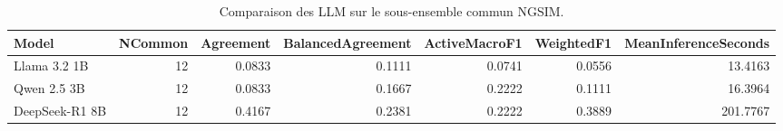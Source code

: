\begin{table}[!htbp]
\caption{Comparaison des LLM sur le sous-ensemble commun NGSIM.}
\label{tab:external_common_metrics}
\begin{tabular}{lrrrrrr}
\toprule
Model & NCommon & Agreement & BalancedAgreement & ActiveMacroF1 & WeightedF1 & MeanInferenceSeconds \\
\midrule
Llama 3.2 1B & 12 & 0.0833 & 0.1111 & 0.0741 & 0.0556 & 13.4163 \\
Qwen 2.5 3B & 12 & 0.0833 & 0.1667 & 0.2222 & 0.1111 & 16.3964 \\
DeepSeek-R1 8B & 12 & 0.4167 & 0.2381 & 0.2222 & 0.3889 & 201.7767 \\
\bottomrule
\end{tabular}
\end{table}
